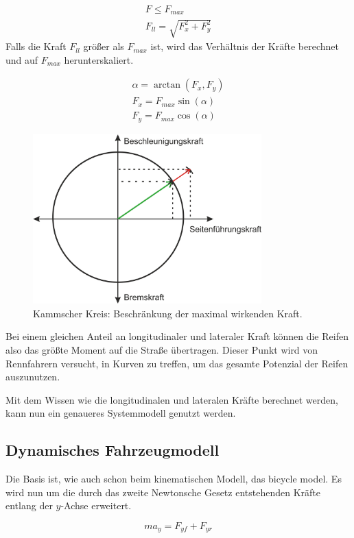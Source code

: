 \documentclass{like}
\begin{document}
\begin{eqnarray}
F \leq F_{max} \\
F_{ll} = \sqrt{F_x^2 + F_y^2}  
\end{eqnarray}
Falls die Kraft $F_{ll}$ größer als $F_{max}$ ist, wird das Verhältnis der Kräfte berechnet und auf $F_{max}$ herunterskaliert.

\begin{eqnarray}
\alpha = \arctan(F_x, F_y)\\
F_x = F_{max} \sin(\alpha)\\
F_y = F_{max} \cos(\alpha)
\end{eqnarray}

\begin{figure}[ht!]
	\centering
	\includegraphics[width=250pt]{Abbildungen/kamKreis.png}
	\caption{Kammscher Kreis: Beschränkung der maximal wirkenden Kraft.}
	\label{fig:kamKreis}
\end{figure}

Bei einem gleichen Anteil an longitudinaler und lateraler Kraft können die Reifen also das größte Moment auf die Straße übertragen. Dieser Punkt wird von Rennfahrern versucht, in Kurven zu treffen, um das gesamte Potenzial der Reifen auszunutzen.

Mit dem Wissen wie die longitudinalen und lateralen Kräfte berechnet werden, kann nun ein genaueres Systemmodell genutzt werden.

\subsection{Dynamisches Fahrzeugmodell}
\label{dynModel}

Die Basis ist, wie auch schon beim kinematischen Modell, das bicycle model. Es wird nun um die durch das zweite Newtonsche Gesetz entstehenden Kräfte entlang der \(y\)-Achse erweitert.

\begin{equation}
ma_y = F_{yf} + F_{yr}
\end{equation}   
\end{document}
